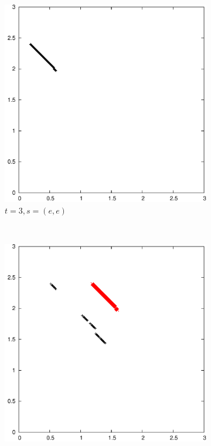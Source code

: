 \documentclass{article}
\begin{document}
\begin{figure}
		\begin{subfigure}[b]{0.3\textwidth}
			\centering
			\includegraphics[width=\textwidth]{images/t3s0}
			\caption{$t=3, s=(e,e)$}
			\label{fig:t3s0}
		\end{subfigure}
		~
		\begin{subfigure}[b]{0.3\textwidth}
			\centering
			\includegraphics[width=\textwidth]{images/t3s1}

\end{subfigure}
\end{figure}
\end{document}
